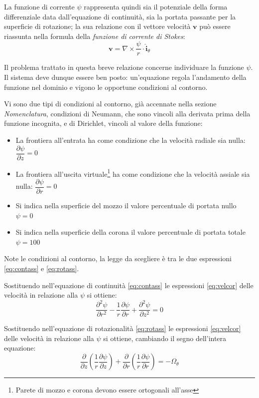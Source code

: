 \documentclass{tufte-handout}
\newcommand{\vect}[1]{\pmb{#1}}
\newcommand{\de}[2]{\dfrac{\partial #1}{\partial #2}}
\newcommand{\dede}[2]{\dfrac{\partial^2 #1}{\partial #2^2}}
\begin{document}
La funzione di corrente $\psi$ rappresenta quindi sia il potenziale della forma differenziale data dall'equazione di continuità, sia la portata passante per la superficie di rotazione; la sua relazione con il vettore velocità $\vect{v}$ può essere riassunta nella formula della \emph{funzione di corrente di Stokes}:
\begin{equation*}
    \vect{v} = \nabla \times \frac{\psi}{r}  \cdot \vect{\hat{i}}_\theta
\end{equation*}

Il problema trattato in questa breve relazione concerne individuare la funzione $\psi$. Il sistema deve dunque essere ben posto: un'equazione regola l'andamento della funzione nel dominio e vigono le opportune condizioni al contorno.

Vi sono due tipi di condizioni al contorno, già accennate nella sezione \emph{Nomenclatura}, condizioni di Neumann, che sono vincoli alla derivata prima della funzione incognita, e di Dirichlet, vincoli al valore della funzione:
\begin{itemize}
    \item La frontiera all'entrata ha come condizione che la velocità radiale sia nulla:$\de{\psi}{z} = 0$
    \item La frontiera all'uscita
    virtuale\footnote{Parete di mozzo e corona devono essere ortogonali all'asse}
    ha come condizione che la velocità assiale sia nulla: $\de{\psi}{r} = 0$
    \item Si indica nella superficie del mozzo il valore percentuale di portata nullo $\psi = 0$
    \item Si indica nella superficie della corona il valore percentuale di portata totale $\psi = 100$
\end{itemize}
Note le condizioni al contorno, la legge da scegliere è tra le due espressioni \ref{eq:contass} e \ref{eq:rotass}.

Sostituendo nell'equazione di continuità \ref{eq:contass} le espressioni \ref{eq:velcor} delle velocità in relazione alla $\psi$ si ottiene:
\begin{equation}
    \dede{\psi}{r} - \frac{1}{r}\de{\psi}{r} + \dede{\psi}{z} = 0
    \label{eq:contpsi}
\end{equation}

Sostituendo nell'equazione di rotazionalità \ref{eq:rotass} le espressioni \ref{eq:velcor} delle velocità in relazione alla $\psi$ si ottiene, cambiando il segno dell'intera equazione:
\begin{equation}
    \de{}{z}\left(\frac{1}{r}\de{\psi}{z}\right)+\de{}{r}\left(\frac{1}{r}\de{\psi}{r}\right) = -\Omega_\theta
    \label{eq:rotasspsi}
\end{equation}
\end{document}
